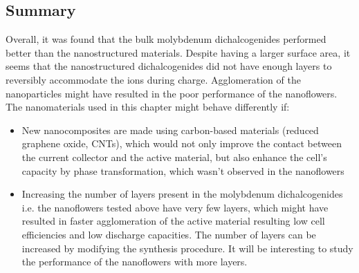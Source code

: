 \subsection{Summary}
Overall, it was found that the bulk molybdenum dichalcogenides performed better than the nanostructured materials. Despite having a larger surface area, it seems that the nanostructured dichalcogenides did not have enough layers to reversibly accommodate the  ions during charge. Agglomeration of the nanoparticles might have resulted in the poor performance of the nanoflowers. 
The nanomaterials used in this chapter might behave differently if:
\begin{itemize}
\item New nanocomposites are made using carbon-based materials (reduced graphene oxide, CNTs), which would not only improve the contact between the current collector and the active material, but also enhance the cell's capacity by phase transformation, which wasn't observed in the nanoflowers
\item Increasing the number of layers present in the molybdenum dichalcogenides i.e. the nanoflowers tested above have very few layers, which might have resulted in faster agglomeration of the active material resulting low cell efficiencies and low discharge capacities. The number of layers can be increased by modifying the synthesis procedure. It will be interesting to study the performance of the nanoflowers with more layers.
\end{itemize}
